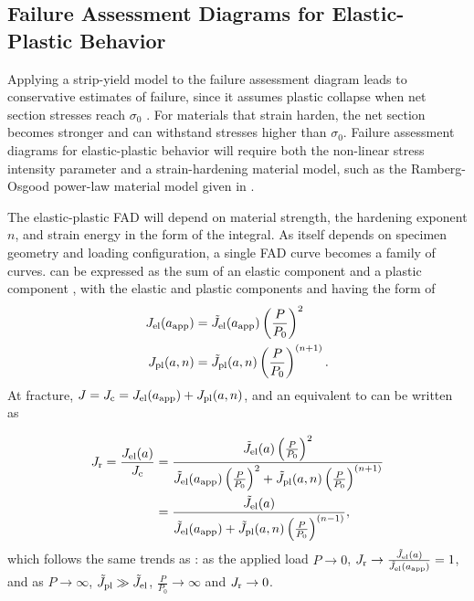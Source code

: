 \subsection{Failure Assessment Diagrams for Elastic-Plastic Behavior}

Applying a strip-yield model to the failure assessment diagram leads to conservative estimates of failure, since it assumes plastic collapse when net section stresses reach \(\sigma_0\) \citep{kanninen1985}.
For materials that strain harden, the net section becomes stronger and can withstand stresses higher than \(\sigma_0\).
Failure assessment diagrams for elastic-plastic behavior will require both the non-linear stress intensity parameter \J and a strain-hardening material model, such as the Ramberg-Osgood power-law material model given in .

The elastic-plastic FAD will depend on material strength, the hardening exponent \(n\), and strain energy in the form of the \J integral. As \J itself depends on specimen geometry and loading configuration, a single FAD curve becomes a family of curves.
\J can be expressed as the sum of an elastic component \Jel and a plastic component \Jpl, with the elastic and plastic components \Jel and \Jpl having the form of
\begin{align}
J_\textnormal{el}(a_{\textnormal{app}}) &= \tilde{J}_\textnormal{el}(a_{\textnormal{app}}) \left(\frac{P}{P_0}\right)^2 \\
J_\textnormal{pl}(a, n) &= \tilde{J}_\textnormal{pl}(a, n) \left(\frac{P}{P_0}\right)^{(n+1)}.
\end{align}
At fracture, \(J = J_\textnormal{c} = J_\textnormal{el}(a_{\textnormal{app}}) + J_\textnormal{pl}(a,n)\), and an equivalent to \Kr can be written as

\begin{align}
J_\textnormal{r} = \frac{J_\textnormal{el}(a)}{J_\textnormal{c}} &= \frac{\tilde{J}_\textnormal{el}(a) \left(\frac{P}{P_0}\right)^2}{\tilde{J}_\textnormal{el}(a_{\textnormal{app}}) \left(\frac{P}{P_0}\right)^2 + \tilde{J}_\textnormal{pl}(a, n) \left(\frac{P}{P_0}\right)^{(n+1)}} \nonumber \\
&= \frac{\tilde{J}_\textnormal{el}(a)}{\tilde{J}_\textnormal{el}(a_{\textnormal{app}}) + \tilde{J}_\textnormal{pl}(a, n) \left(\frac{P}{P_0}\right)^{(n-1)}},
\end{align}
which follows the same trends as \Kr:
as the applied load \(P \rightarrow 0 \),
\( J_\textnormal{r} \rightarrow \frac{\tilde{J}_\textnormal{el}(a)}{\tilde{J}_\textnormal{el}(a_{\textnormal{app}})} = 1 \),
and as \(P \rightarrow \infty \),
\(\tilde{J}_\textnormal{pl} \gg \tilde{J}_\textnormal{el}\), \(\frac{P}{P_0} \rightarrow \infty \) and \(J_\textnormal{r} \rightarrow 0 \).

